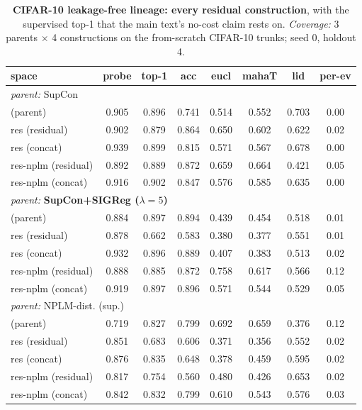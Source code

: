 \begin{table}[t]
\centering
\small
\begin{tabular}{lccccccc}
\toprule
space & probe & top-1 & acc & eucl & mahaT & lid & per-ev \\
\midrule
\multicolumn{8}{l}{\emph{parent: }SupCon} \\
\quad (parent) & 0.905 & 0.896 & 0.741 & 0.514 & 0.552 & 0.703 & 0.00 \\
\quad res (residual) & 0.902 & 0.879 & 0.864 & 0.650 & 0.602 & 0.622 & 0.02 \\
\quad res (concat) & 0.939 & 0.899 & 0.815 & 0.571 & 0.567 & 0.678 & 0.00 \\
\quad res-nplm (residual) & 0.892 & 0.889 & 0.872 & 0.659 & 0.664 & 0.421 & 0.05 \\
\quad res-nplm (concat) & 0.916 & 0.902 & 0.847 & 0.576 & 0.585 & 0.635 & 0.00 \\
\multicolumn{8}{l}{\emph{parent: }\textbf{SupCon+SIGReg ($\lambda{=}5$)}} \\
\quad (parent) & 0.884 & 0.897 & 0.894 & 0.439 & 0.454 & 0.518 & 0.01 \\
\quad res (residual) & 0.878 & 0.662 & 0.583 & 0.380 & 0.377 & 0.551 & 0.01 \\
\quad res (concat) & 0.932 & 0.896 & 0.889 & 0.407 & 0.383 & 0.513 & 0.02 \\
\quad res-nplm (residual) & 0.888 & 0.885 & 0.872 & 0.758 & 0.617 & 0.566 & 0.12 \\
\quad res-nplm (concat) & 0.919 & 0.897 & 0.896 & 0.571 & 0.544 & 0.529 & 0.05 \\
\multicolumn{8}{l}{\emph{parent: }NPLM-dist. (sup.)} \\
\quad (parent) & 0.719 & 0.827 & 0.799 & 0.692 & 0.659 & 0.376 & 0.12 \\
\quad res (residual) & 0.851 & 0.683 & 0.606 & 0.371 & 0.356 & 0.552 & 0.02 \\
\quad res (concat) & 0.876 & 0.835 & 0.648 & 0.378 & 0.459 & 0.595 & 0.02 \\
\quad res-nplm (residual) & 0.817 & 0.754 & 0.560 & 0.480 & 0.426 & 0.653 & 0.02 \\
\quad res-nplm (concat) & 0.842 & 0.832 & 0.799 & 0.610 & 0.543 & 0.576 & 0.03 \\
\bottomrule
\end{tabular}
\caption{\textbf{CIFAR-10 leakage-free lineage: every residual construction}, with the supervised top-1 that the main text's no-cost claim rests on. \emph{Coverage:} 3 parents $\times$ 4 constructions on the from-scratch CIFAR-10 trunks; seed 0, holdout 4.}
\label{tab:app_cifar10_residuals}
\end{table}

